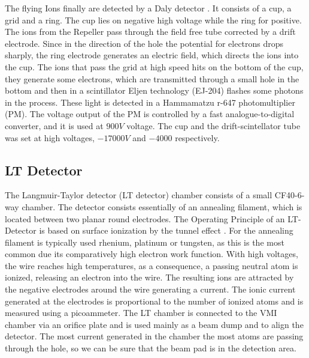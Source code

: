 The flying Ions finally are detected by a Daly detector \cite{daly_scintillation_1960}. It consists of a cup, a grid and a ring. The cup lies on negative high voltage while the ring for positive. The ions from the Repeller pass through the field free tube corrected by a drift electrode.  Since in the direction of the hole the potential for electrons drops sharply, the ring electrode generates an electric field, which directs the ions into the cup. The ions that pass the grid at high speed hits on the bottom of the cup, they generate some electrons, which are transmitted through a small hole in the bottom and then in a scintillator Eljen technology (EJ-204) flashes some photons in the process. These light is detected in a Hammamatzu r-647 photomultiplier (PM). The voltage output of the PM is controlled by a fast analogue-to-digital converter, and it is used at $900V$ voltage. The cup and the drift-scintellator  tube was set at high voltages,  $-17000V$ and $-4000$ respectively.

\subsection{LT Detector}

The Langmuir-Taylor detector (LT detector) chamber consists of a small CF40-6-way chamber. The detector consists essentially of an annealing filament, which is located between two planar round electrodes. The Operating Principle of an LT-Detector is based on surface ionization by the tunnel effect \cite{delhuille_optimization_2002}. For the annealing filament is typically used  rhenium, platinum or tungsten, as this is the most common due its comparatively high electron work function. With high voltages, the wire reaches high temperatures, as a consequence, a passing neutral atom is ionized, releasing an electron into the wire. The resulting ions are attracted by the negative electrodes around the wire generating a current. The ionic current generated at the electrodes is proportional to the number of ionized atoms and is measured using a picoammeter.
The LT chamber is connected to the VMI chamber via an orifice plate and is used mainly as a beam dump and to align the detector. The most current generated in the chamber the most atoms are passing through the hole, so we can be sure that the beam pad is in the detection area.

